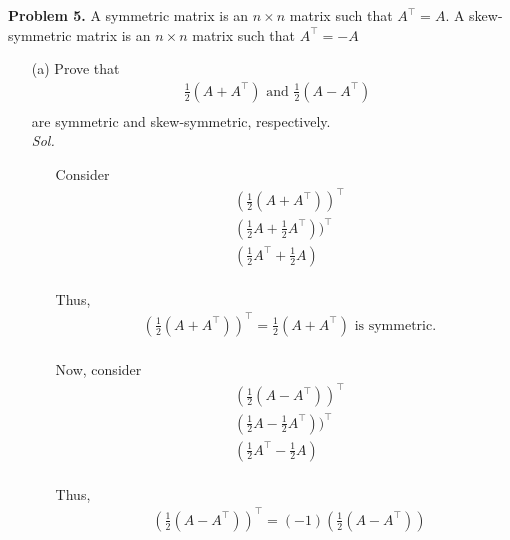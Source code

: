 \documentclass[11pt]{article}
\begin{document}
\clearpage
	{\bf Problem 5.} A symmetric matrix is an $n \times n$ matrix such that $A^\top = A$. A
  skew-symmetric matrix is an $n \times n$ matrix such that $A^\top = -A$
\begin{itemize}
  \item[(a)] Prove that \begin{align*}
      & \frac{1}{2}(A + A^\top) \text{ and } \frac{1}{2}(A - A^\top)\\
    \end{align*} are symmetric and skew-symmetric, respectively.\\

    \textit{ Sol. }
    \begin{itemize}
      \item[] Consider \begin{align*}
        & (\frac{1}{2}(A + A^\top))^\top \\
        & (\frac{1}{2}A + \frac{1}{2}A^\top))^\top \\
        & (\frac{1}{2}A^\top + \frac{1}{2}A) \\
      \end{align*}
    \item[] Thus, \begin{align*}
      & (\frac{1}{2}(A + A^\top))^\top =  \frac{1}{2}(A + A^\top) \text{ is symmetric.}\\
    \end{align*}
  \item[] Now, consider \begin{align*}
      & (\frac{1}{2}(A - A^\top))^\top \\
      & (\frac{1}{2}A - \frac{1}{2}A^\top))^\top \\
      & (\frac{1}{2}A^\top - \frac{1}{2}A) \\
    \end{align*}
  \item[] Thus, \begin{align*}
      & (\frac{1}{2}(A - A^\top))^\top = (-1)(\frac{1}{2}(A - A^\top))  \\
    \end{align*}
    \end{itemize}



\end{itemize}
\end{document}
